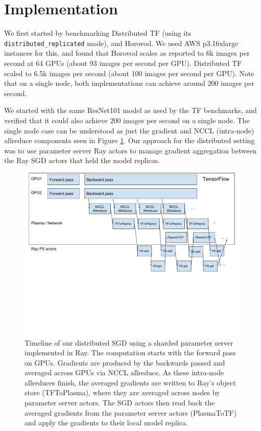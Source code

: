 \section{Implementation}
We first started by benchmarking Distributed TF (using its \texttt{distributed\_replicated} mode), and Horovod. We used AWS p3.16xlarge instances for this, and found that Horovod scales as reported to 6k images per second at 64 GPUs (about 93 images per second per GPU). Distributed TF scaled to 6.5k images per second (about 100 images per second per GPU). Note that on a single node, both implementations can achieve around 200 images per second.

We started with the same ResNet101 model as used by the TF benchmarks, and verified that it could also achieve 200 images per second on a single node. The single node case can be understood as just the gradient and NCCL (intra-node) allreduce components seen in Figure \ref{fig:pipeline}. Our approach for the distributed setting was to use parameter server Ray actors to manage gradient aggregation between the Ray SGD actors that held the model replicas.

\begin{figure}
    \centering
    \includegraphics[width=5.1in,keepaspectratio]{fig/pipeline.pdf}
    \caption{
    \small{
        Timeline of our distributed SGD using a sharded parameter server implemented in Ray. The computation starts with the forward pass on GPUs. Gradients are produced by the backwards passed and averaged across GPUs via NCCL allreduce. As these intra-node allreduces finish, the averaged gradients are written to Ray's object store (TFToPlasma), where they are averaged across nodes by parameter server actors. The SGD actors then read back the averaged gradients from the parameter server actors (PlasmaToTF) and apply the gradients to their local model replica.
    }
    }
    \label{fig:pipeline}
\end{figure}

